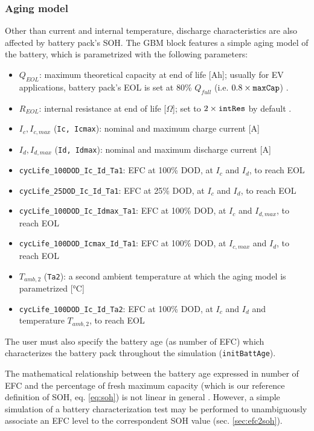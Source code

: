 \subsubsection{Aging model}
\label{sec:aging_model}
Other than current and internal temperature, discharge characteristics are also affected by battery pack's SOH. The GBM block features a simple aging model of the battery, which is parametrized with the following parameters:
\begin{itemize}
    \item $Q_{EOL}$: maximum theoretical capacity at end of life [Ah]; usually for EV applications, battery pack's EOL is set at 80\% $Q_{full}$ (i.e. $0.8\times\text{\texttt{maxCap}}$) \cite{cap_eol}.
    \item $R_{EOL}$: internal resistance at end of life [$\Omega$]; set to $2\times\text{\texttt{intRes}}$ by default \cite{r_eol}.
    \item $I_c, I_{c,max}$ (\texttt{Ic, Icmax}): nominal and maximum charge current [A]
    \item $I_d, I_{d,max}$ (\texttt{Id, Idmax}): nominal and maximum discharge current [A]
    \item \texttt{cycLife\_100DOD\_Ic\_Id\_Ta1}: EFC at 100\% DOD, at $I_c$ and $I_d$, to reach EOL
    \item \texttt{cycLife\_25DOD\_Ic\_Id\_Ta1}: EFC at 25\% DOD, at $I_c$ and $I_d$, to reach EOL
    \item \texttt{cycLife\_100DOD\_Ic\_Idmax\_Ta1}: EFC at 100\% DOD, at $I_c$ and $I_{d,max}$, to reach EOL
    \item \texttt{cycLife\_100DOD\_Icmax\_Id\_Ta1}: EFC at 100\% DOD, at $I_{c,max}$ and $I_d$, to reach EOL
    \item $T_{amb,2}$ (\texttt{Ta2}): a second ambient temperature at which the aging model is parametrized [°C]
    \item \texttt{cycLife\_100DOD\_Ic\_Id\_Ta2}: EFC at 100\% DOD, at $I_c$ and $I_d$ and temperature $T_{amb,2}$, to reach EOL
\end{itemize}
The user must also specify the battery age (as number of EFC) which characterizes the battery pack throughout the simulation (\texttt{initBattAge}).

The mathematical relationship between the battery age expressed in number of EFC and the percentage of fresh maximum capacity (which is our reference definition of SOH, eq. \ref{eq:soh}) is not linear in general \cite{efc_vs_soh}. However, a simple simulation of a battery characterization test may be performed to unambiguously associate an EFC level to the correspondent SOH value (sec. \ref{sec:efc2soh}).



